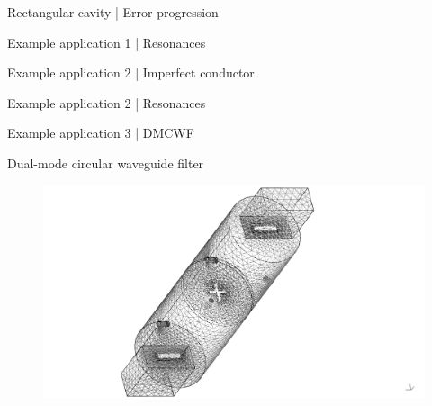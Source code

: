 \documentclass{beamer}
\begin{document}
\begin{frame}{Rectangular cavity | Error progression}

    \begin{figure}
        \centering
        \scalebox{0.8}{}
    \end{figure}

\end{frame}

\begin{frame}{Example application 1 | Resonances}

    \begin{figure}
        \centering
        \scalebox{0.8}{}
    \end{figure}

\end{frame}

\begin{frame}{Example application 2 | Imperfect conductor}

    \begin{figure}
        \centering
        \scalebox{0.8}{}
    \end{figure}

\end{frame}

\begin{frame}{Example application 2 | Resonances}

    \begin{figure}
        \centering
        \scalebox{0.8}{}
    \end{figure}

\end{frame}

\begin{frame}{Example application 3 | DMCWF}

    Dual-mode circular waveguide filter

    \begin{figure}
        \centering
        \includegraphics[scale=0.18, trim=12cm 0.2cm 15cm 0.2cm, clip]{../report/figures/DMCWF_surfacemesh.pdf}
    \end{figure}

\end{frame}
\end{document}
